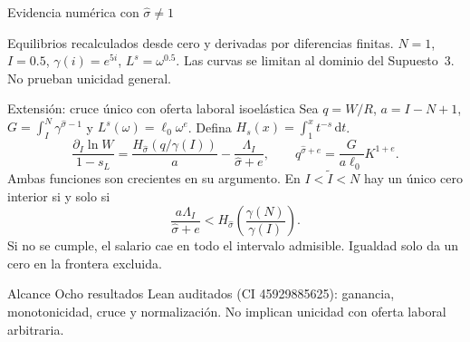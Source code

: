 \documentclass[aspectratio=169,10pt]{beamer}
\newcommand{\sh}{\hat\sigma}
\begin{document}
\begin{frame}{Evidencia numérica con $\sh\neq1$}
\centering
{}

\small Equilibrios recalculados desde cero y derivadas por diferencias finitas. $N=1$, $I=0.5$, $\gamma(i)=e^{5i}$, $L^s=\omega^{0.5}$.
Las curvas se limitan al dominio del Supuesto~3. No prueban unicidad general.
\end{frame}

\begin{frame}{Extensión: cruce único con oferta laboral isoelástica}
\small
Sea $q=W/R$, $a=I-N+1$, $G=\int_I^N\gamma^{\sh-1}$ y $L^s(\omega)=\ell_0\omega^e$.
Defina $H_s(x)=\int_1^x t^{-s}\,\mathrm dt$.
\[
 \frac{\partial_I\ln W}{1-s_L}
 =\frac{H_{\sh}(q/\gamma(I))}{a}-\frac{\Lambda_I}{\sh+e},
 \qquad
 q^{\sh+e}=\frac{G}{a\ell_0}K^{1+e}.
\]
Ambas funciones son crecientes en su argumento. En $I<\tilde I<N$ hay un único cero interior si y solo si
\[
 \frac{a\Lambda_I}{\sh+e}<H_{\sh}\!\left(\frac{\gamma(N)}{\gamma(I)}\right).
\]
Si no se cumple, el salario cae en todo el intervalo admisible. Igualdad solo da un cero en la frontera excluida.
\begin{block}{Alcance}
Ocho resultados Lean auditados (CI 45929885625): ganancia, monotonicidad, cruce y normalización. No implican unicidad con oferta laboral arbitraria.
\end{block}
\end{frame}
\end{document}
